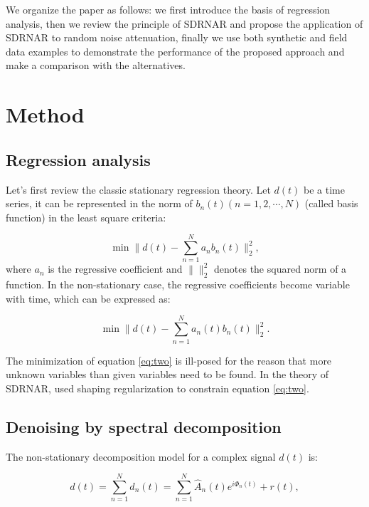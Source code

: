 We organize the paper as follows: we first introduce the basis of regression analysis, then we review the principle of SDRNAR and propose the application of SDRNAR to random noise attenuation, finally we use both synthetic and field data examples to demonstrate the performance of the proposed approach and make a comparison with the alternatives.


\section{Method}
\subsection{Regression analysis}

Let's first review the classic stationary regression theory. Let $d(t)$ be a time series, it can be represented in the norm of $b_n(t)(n=1,2,\cdots,N)$ (called basis function) in the least square criteria: 

\begin{equation}
\label{eq:one}
\min\parallel d(t)-\sum_{n=1}^{N}a_nb_n(t)\parallel_2^2,
\end{equation}
where $a_n$ is the regressive coefficient and $\parallel \parallel_2^2$ denotes the squared  norm of a function. In the non-stationary case, the regressive coefficients become variable with time, which can be expressed as:

\begin{equation}
\label{eq:two}
\min\parallel d(t)-\sum_{n=1}^{N}a_n(t)b_n(t)\parallel_2^2.
\end{equation}

The minimization of equation \ref{eq:two} is ill-posed for the reason that more unknown variables than given variables need to be found. In the theory of SDRNAR, \cite{sdrnar} used shaping regularization to constrain equation \ref{eq:two}.

\subsection{Denoising by spectral decomposition}

The non-stationary decomposition model for a complex signal $d(t)$ is:

\begin{equation}
\label{eq:three}
d(t)=\sum_{n=1}^{N}d_n(t)=\sum_{n=1}^{N}\hat{A}_n(t)e^{i\Phi_n(t)}+r(t),
\end{equation}


